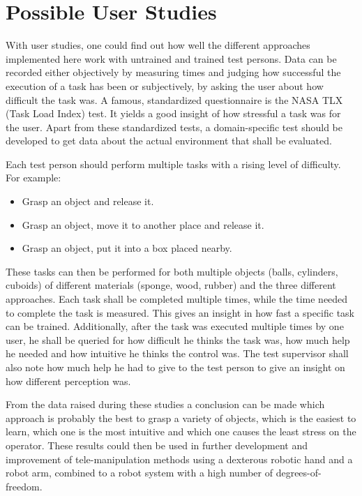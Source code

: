 \section{Possible User Studies}

With user studies, one could find out how well the different approaches implemented here work with untrained and trained test persons. Data can be recorded either objectively by measuring times and judging how successful the execution of a task has been or subjectively, by asking the user about how difficult the task was. A famous, standardized questionnaire is the NASA TLX (Task Load Index) test\cite{Hart1988}. It yields a good insight of how stressful a task was for the user. Apart from these standardized tests, a domain-specific test should be developed to get data about the actual environment that shall be evaluated.

Each test person should perform multiple tasks with a rising level of difficulty. For example:
\begin{itemize}
	\item Grasp an object and release it.
	\item Grasp an object, move it to another place and release it.
	\item Grasp an object, put it into a box placed nearby.
\end{itemize}
These tasks can then be performed for both multiple objects (balls, cylinders, cuboids) of different materials (sponge, wood, rubber) and the three different approaches. Each task shall be completed multiple times, while the time needed to complete the task is measured. This gives an insight in how fast a specific task can be trained. Additionally, after the task was executed multiple times by one user, he shall be queried for how difficult he thinks the task was, how much help he needed and how intuitive he thinks the control was. The test supervisor shall also note how much help he had to give to the test person to give an insight on how different perception was. 

From the data raised during these studies a conclusion can be made which approach is probably the best to grasp a variety of objects, which is the easiest to learn, which one is the most intuitive and which one causes the least stress on the operator. These results could then be used in further development and improvement of tele-manipulation methods using a dexterous robotic hand and a robot arm, combined to a robot system with a high number of degrees-of-freedom.